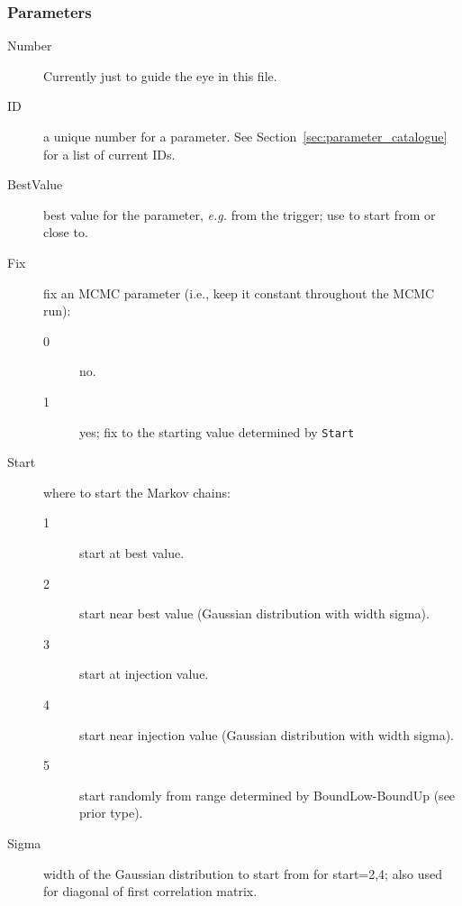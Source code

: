 \documentclass[10pt]{article}
\begin{document}
\subsubsection{Parameters}
\begin{description}                
\item[Number] Currently just to guide the eye in this file.
\item[ID] a unique number for a parameter.  See Section~\ref{sec:parameter_catalogue} for a list of current IDs.
\item[BestValue] best value for the parameter, \textit{e.g.} from the trigger;  use to start from or close to.
\item[Fix] fix an MCMC parameter (i.e., keep it constant throughout the MCMC run):
  \begin{description}                
  \item[0] no.
  \item[1] yes; fix to the starting value determined by \texttt{Start}
  \end{description}                
\item[Start] where to start the Markov chains:
  \begin{description}                
  \item[1] start at best value.
  \item[2] start near best value (Gaussian distribution with width sigma).
  \item[3] start at injection value.
  \item[4] start near injection value (Gaussian distribution with width sigma).
  \item[5] start randomly from range determined by BoundLow-BoundUp (see prior type).
  \end{description}                
\item[Sigma] width of the Gaussian distribution to start from for start=2,4; also used for diagonal of first correlation matrix.
\end{description}                
\end{document}
